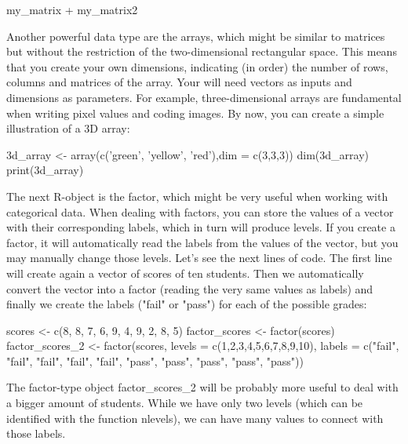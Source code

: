 \begin{exampler}
my_matrix + my_matrix2
\end{exampler}

Another powerful data type are the arrays, which might be similar to matrices but without the restriction of the two-dimensional rectangular space. This means that you create your own dimensions, indicating (in order) the number of rows, columns and matrices of the array. Your will need vectors as inputs and dimensions as parameters. For example, three-dimensional arrays are fundamental when writing pixel values and coding images.  By now, you can create a simple illustration of a 3D array:

\begin{exampler}
3d_array <- array(c('green', 'yellow', 'red'),dim = c(3,3,3))
dim(3d_array)
print(3d_array)
\end{exampler}

The next R-object is the factor, which might be very useful when working with categorical data. When dealing with factors, you can store the values of a vector with their corresponding labels, which in turn will produce levels. If you create a factor, it will automatically read the labels from the values of the vector, but you may manually change those levels. Let's see the next lines of code. The first line will create again a vector of scores of ten students. Then we automatically convert the vector into a factor (reading the very same values as labels) and finally we create the labels ("fail" or "pass") for each of the possible grades:

\begin{exampler}
scores <- c(8, 8, 7, 6, 9, 4, 9, 2, 8, 5)
factor_scores <- factor(scores)
factor_scores_2 <- factor(scores, levels = c(1,2,3,4,5,6,7,8,9,10), labels = c("fail", "fail", "fail", "fail", "fail", "pass", "pass", "pass", "pass", "pass"))
\end{exampler}

The factor-type object factor\_scores\_2 will be probably more useful to deal with a bigger amount of students. While we have only two levels (which can be identified with the function nlevels), we can have many values to connect with those labels.

